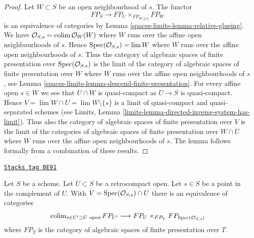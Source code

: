 \begin{proof}
Let $W \subset S$ be an open neighbourhood of $s$. The functor
$$
FP_S \to FP_U \times_{FP_{W \setminus \{s\}}} FP_W
$$
is an equivalence of categories by Lemma \ref{spaces-limits-lemma-relative-glueing}.
We have $\mathcal{O}_{S, s} = \operatorname{colim} \mathcal{O}_W(W)$ where
$W$ runs over the affine open neighbourhoods of $s$.
Hence $\operatorname{Spec}(\mathcal{O}_{S, s}) = \lim W$ where $W$
runs over the affine open neighbourhoods of $s$.
Thus the category of algebraic spaces of finite presentation
over $\operatorname{Spec}(\mathcal{O}_{S, s})$ is the limit of the
category of algebraic spaces of finite presentation over
$W$ where $W$ runs over the affine open neighbourhoods
of $s$, see
Lemma \ref{spaces-limits-lemma-descend-finite-presentation}.
For every affine open $s \in W$ we see that $U \cap W$
is quasi-compact as $U \to S$ is quasi-compact.
Hence $V = \lim W \cap U = \lim W \setminus \{s\}$ is a limit of
quasi-compact and quasi-separated schemes (see
Limits, Lemma \ref{limits-lemma-directed-inverse-system-has-limit}).
Thus also the category of algebraic spaces of finite presentation
over $V$ is the limit of the
categories of algebraic spaces of finite presentation over
$W \cap U$ where $W$ runs over the affine open neighbourhoods
of $s$. The lemma follows formally from a combination
of these results.
\end{proof}

\begin{lemma}
\label{spaces-limits-lemma-glueing-near-point}
\href{https://stacks.math.columbia.edu/tag/0E91}{\texttt{Stacks tag 0E91}}

Let $S$ be a scheme. Let $U \subset S$ be a retrocompact open.
Let $s \in S$ be a point in the complement of $U$. With
$V = \operatorname{Spec}(\mathcal{O}_{S, s}) \cap U$ there is
an equivalence of categories
$$
\operatorname{colim}_{s \in U' \supset U\text{ open}} FP_{U'}
\longrightarrow
FP_U \times_{FP_V} FP_{\operatorname{Spec}(\mathcal{O}_{S, s})}
$$
where $FP_T$  is the category of algebraic spaces of finite presentation
over $T$.
\end{lemma}

